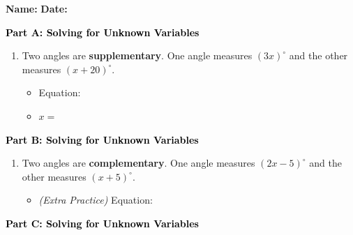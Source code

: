 \documentclass[12pt, letterpaper, fleqn]{article}
\newcommand{\blank}{\underline{\hspace{2.2cm}}}
\newcommand{\blanklong}{\underline{\hspace{6.5cm}}}
\begin{document}
\textbf{Name:} \underline{\hspace{5cm}}
\hfill
\textbf{Date:} \underline{\hspace{3cm}}\\

\begin{tcolorbox}[colback=customteal!20]
\large\textcolor{black}{\textbf{Part A: Solving for Unknown Variables}}
\end{tcolorbox}

\vspace{3mm}

\begin{enumerate}[itemsep=2.5cm, leftmargin=0.6cm]
\item Two angles are \textbf{supplementary}. One angle measures $(3x)^\circ$ and the other measures $(x + 20)^\circ$.
\begin{itemize}
\item Equation: \blanklong
\item $x = $ \blank
\end{itemize}
\end{enumerate}

\newpage

\begin{tcolorbox}[colback=customteal!20]
\large\textcolor{black}{\textbf{Part B: Solving for Unknown Variables}}
\end{tcolorbox}

\vspace{3mm}

\begin{enumerate}[itemsep=2.5cm, leftmargin=0.6cm, resume]
\begin{itemize}
\item Angle Measures: \blank
\end{itemize}
\item Two angles are \textbf{complementary}. One angle measures $(2x - 5)^\circ$ and the other measures $(x + 5)^\circ$.
\begin{itemize}
\item \textit{(Extra Practice)} Equation: \blanklong
\end{itemize}
\end{enumerate}

\newpage

\begin{tcolorbox}[colback=customteal!20]
\large\textcolor{black}{\textbf{Part C: Solving for Unknown Variables}}
\end{tcolorbox}
\end{document}
